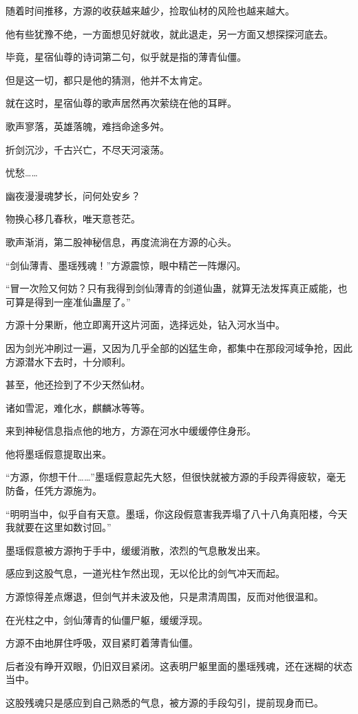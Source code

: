 \begin{this_body}
随着时间推移，方源的收获越来越少，捡取仙材的风险也越来越大。

他有些犹豫不绝，一方面想见好就收，就此退走，另一方面又想探探河底去。

毕竟，星宿仙尊的诗词第二句，似乎就是指的薄青仙僵。

但是这一切，都只是他的猜测，他并不太肯定。

就在这时，星宿仙尊的歌声居然再次萦绕在他的耳畔。

歌声寥落，英雄落魄，难挡命途多舛。

折剑沉沙，千古兴亡，不尽天河滚荡。

忧愁……

幽夜漫漫魂梦长，问何处安乡？

物换心移几春秋，唯天意苍茫。

歌声渐消，第二股神秘信息，再度流淌在方源的心头。

“剑仙薄青、墨瑶残魂！”方源震惊，眼中精芒一阵爆闪。

“冒一次险又何妨？只有我得到剑仙薄青的剑道仙蛊，就算无法发挥真正威能，也可算是得到一座准仙蛊屋了。”

方源十分果断，他立即离开这片河面，选择远处，钻入河水当中。

因为剑光冲刷过一遍，又因为几乎全部的凶猛生命，都集中在那段河域争抢，因此方源潜水下去时，十分顺利。

甚至，他还捡到了不少天然仙材。

诸如雪泥，难化水，麒麟冰等等。

来到神秘信息指点他的地方，方源在河水中缓缓停住身形。

他将墨瑶假意提取出来。

“方源，你想干什……”墨瑶假意起先大怒，但很快就被方源的手段弄得疲软，毫无防备，任凭方源施为。

“明明当中，似乎自有天意。墨瑶，你这段假意害我弄塌了八十八角真阳楼，今天我就要在这里如数讨回。”

墨瑶假意被方源拘于手中，缓缓消散，浓烈的气息散发出来。

感应到这股气息，一道光柱乍然出现，无以伦比的剑气冲天而起。

方源惊得差点爆退，但剑气并未波及他，只是肃清周围，反而对他很温和。

在光柱之中，剑仙薄青的仙僵尸躯，缓缓浮现。

方源不由地屏住呼吸，双目紧盯着薄青仙僵。

后者没有睁开双眼，仍旧双目紧闭。这表明尸躯里面的墨瑶残魂，还在迷糊的状态当中。

这股残魂只是感应到自己熟悉的气息，被方源的手段勾引，提前现身而已。


\end{this_body}
